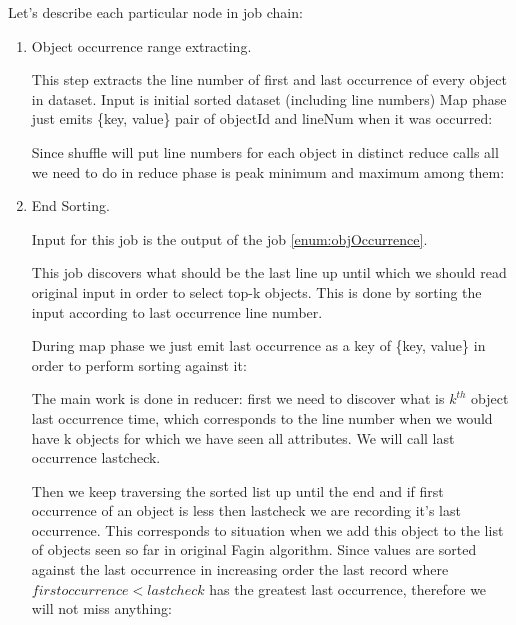\documentclass[a4paper]{article}
\begin{document}
Let's describe each particular node in job chain:
\begin{enumerate}
    \item Object occurrence range extracting. \label{enum:objOccurrence}

    This step extracts the line number of first and last occurrence of every object in dataset.
    Input is initial sorted dataset (including line numbers)
    Map phase just emits \{key, value\} pair of objectId and lineNum when it was occurred:
    

    Since shuffle will put line numbers for each object in distinct reduce calls all we need to do in reduce phase is peak minimum and maximum among them: 
    

    \item End Sorting.
    \label{enum:endSort}

    Input for this job is the output of the job \ref{enum:objOccurrence}.

    This job discovers what should be the last line up until which we should read original input in order to select top-k objects.
    This is done by sorting the input according to last occurrence line number.
    
    During map phase we just emit last occurrence as a key of \{key, value\} in order to perform sorting against it:
    

    The main work is done in reducer: first we need to discover what is $k^{th}$ object last occurrence time, which corresponds to the line number when we would have k objects for which we have seen all attributes.
    We will call last occurrence lastcheck.

    Then we keep traversing the sorted list up until the end and if first occurrence of an object is less then lastcheck we are recording it's last occurrence.
    This corresponds to situation when we add this object to the list of objects seen so far in original Fagin algorithm.
    Since values are sorted against the last occurrence in increasing order the last record where $first occurrence < lastcheck$ has the greatest last occurrence, therefore we will not miss anything:
    


\end{enumerate}
\end{document}
